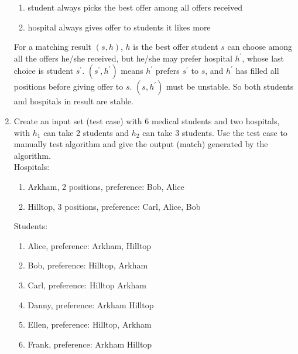\documentclass[14pt, a4paper]{article}
\begin{document}
\begin{enumerate}
    \begin{enumerate}
        \item student always picks the best offer among all offers received
        \item hospital always gives offer to students it likes more
    \end{enumerate}

For a matching result $(s, h)$, $h$ is the best offer student $s$ can choose 
among all the offers he/she received, but he/she may prefer hospital $h^{\prime}$, 
whose last choice is student $s^{\prime}$. $(s^{\prime}, h^{\prime})$ 
means $h^{\prime}$ prefers $s^{\prime}$ to $s$, and $h^{\prime}$ has filled 
all positions before giving offer to $s$. $(s, h^{\prime})$ must be unstable. 
So both students and hospitals in result are stable.
    
\item Create an input set (test case) with 6 medical students and two hospitals, with $h_1$ can take 2 students and $h_2$ can take 3 students. Use the test case to manually test algorithm and give the output (match) generated by the algorithm. \\

    Hospitals:
    \begin{enumerate}
        \item Arkham, 2 positions, preference: Bob, Alice
        \item Hilltop, 3 positions, preference: Carl, Alice, Bob
    \end{enumerate}
    
    Students:
    \begin{enumerate}
        \item Alice, preference: Arkham, Hilltop
        \item Bob, preference: Hilltop, Arkham
        \item Carl, preference: Hilltop Arkham
        \item Danny, preference: Arkham Hilltop
        \item Ellen, preference: Hilltop, Arkham
        \item Frank, preference: Arkham Hilltop
    \end{enumerate}


\end{enumerate}
\end{document}
